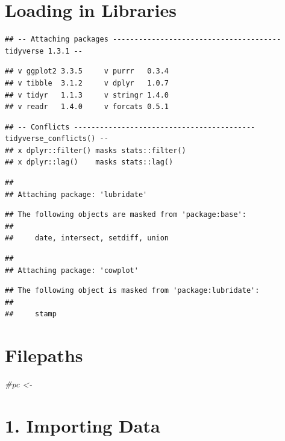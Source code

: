\documentclass[
]{article}
\newenvironment{Shaded}{\begin{snugshade}}{\end{snugshade}}
\newcommand{\CommentTok}[1]{\textcolor[rgb]{0.56,0.35,0.01}{\textit{#1}}}
\begin{document}
\hypertarget{loading-in-libraries}{%
\section{Loading in Libraries}\label{loading-in-libraries}}

\begin{verbatim}
## -- Attaching packages --------------------------------------- tidyverse 1.3.1 --
\end{verbatim}

\begin{verbatim}
## v ggplot2 3.3.5     v purrr   0.3.4
## v tibble  3.1.2     v dplyr   1.0.7
## v tidyr   1.1.3     v stringr 1.4.0
## v readr   1.4.0     v forcats 0.5.1
\end{verbatim}

\begin{verbatim}
## -- Conflicts ------------------------------------------ tidyverse_conflicts() --
## x dplyr::filter() masks stats::filter()
## x dplyr::lag()    masks stats::lag()
\end{verbatim}

\begin{verbatim}
## 
## Attaching package: 'lubridate'
\end{verbatim}

\begin{verbatim}
## The following objects are masked from 'package:base':
## 
##     date, intersect, setdiff, union
\end{verbatim}

\begin{verbatim}
## 
## Attaching package: 'cowplot'
\end{verbatim}

\begin{verbatim}
## The following object is masked from 'package:lubridate':
## 
##     stamp
\end{verbatim}

\hypertarget{filepaths}{%
\section{Filepaths}\label{filepaths}}

\begin{Shaded}
\begin{Highlighting}[]
\CommentTok{\#pc \textless{}{-}}
\end{Highlighting}
\end{Shaded}

\hypertarget{importing-data}{%
\section{1. Importing Data}\label{importing-data}}
\end{document}
